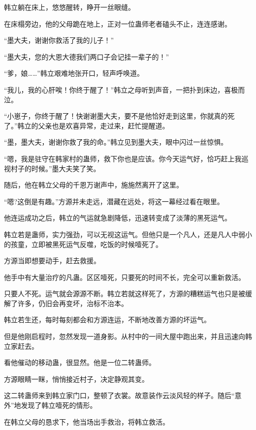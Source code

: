 
\begin{this_body}



韩立躺在床上，悠悠醒转，睁开一丝眼缝。

在床榻旁边，他的父母跪在地上，正对一位蛊师老者磕头不止，连连感谢。

“墨大夫，谢谢你救活了我的儿子！”

“墨大夫，您的大恩大德我们两口子会记挂一辈子的！”

“爹，娘……”韩立艰难地张开口，轻声呼唤道。

“我儿，我的心肝唉！你终于醒了！”韩立之母听到声音，一把扑到床边，喜极而泣。

“小崽子，你终于醒了！快谢谢墨大夫，要不是他恰好走到这里，你就真的死了。”韩立的父亲也是欢喜异常，走过来，赶忙提醒道。

“墨，墨大夫，谢谢你救了我的命。”韩立见到墨大夫，眼中闪过一丝惊惧。

“嗯，我是驻守在韩家村的蛊师，救下你也是应该。你今天运气好，恰巧赶上我巡视村子的时候。”墨大夫笑了笑。

随后，他在韩立父母的千恩万谢声中，施施然离开了这里。

“嗯?这倒是有趣。”方源并未走远，潜藏在远处，将这一幕经过看在眼里。

他连运成功之后，韩立的气运就急剧降低，迅速转变成了淡薄的黑死运气。

韩立若是蛊师，实力强劲，可以无视这运气。但他只是一个凡人，还是凡人中弱小的孩童，立即被黑死运气反噬，吃饭的时候噎死了。

方源当即想要动手，赶去救援。

他手中有大量治疗的凡蛊。区区噎死，只要死的时间不长，完全可以重新救活。

只要人不死。运气就会源源不断。韩立若就这样死了，方源的糟糕运气也只是被缓解了许多，仍旧会再变坏，治标不治本。

韩立若生还，每时每刻都会和方源连运，不断地改善方源的坏运气。

但是他刚启程时，忽然发现一道身影。从村中的一间大屋中跑出来，并且迅速向韩立家赶去。

看他催动的移动蛊，很显然。他是一位二转蛊师。

方源眼睛一眯，悄悄接近村子，决定静观其变。

这二转蛊师来到韩立家门口，整顿了衣裳。故意装作云淡风轻的样子。随后“意外”地发现了韩立噎死的情形。

在韩立父母的恳求下，他当场出手救治，将韩立救活。


\end{this_body}
